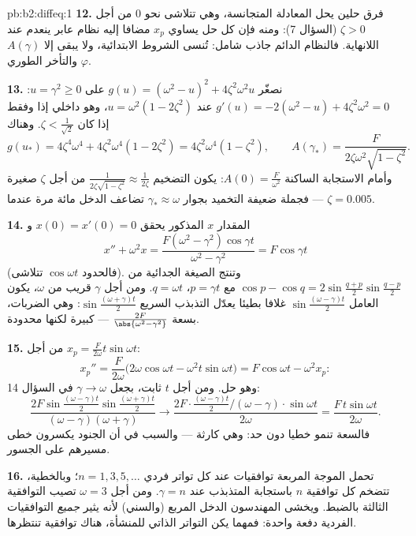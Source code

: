 \begin{solution}{pb:b2:diffeq:1}
\textbf{12.} فرق حلين يحل المعادلة المتجانسة، وهي تتلاشى نحو $0$
من أجل $\zeta > 0$ (السؤال 7): ومنه فإن كل حل يساوي $x_p$ مضافا إليه
نظام عابر ينعدم عند اللانهاية. فالنظام الدائم جاذب شامل: تُنسى
الشروط الابتدائية، ولا يبقى إلا $A(\gamma)$ والتأخر الطوري $\varphi$.

\textbf{13.} نصغّر $g(u) = (\omega^2 - u)^2 +
4\zeta^2\omega^2u$ على $u = \gamma^2 \geq 0$: $g'(u) =
-2(\omega^2 - u) + 4\zeta^2\omega^2 = 0$ عند $u = \omega^2(1 -
2\zeta^2)$، وهو داخلي
إذا وفقط إذا كان $\zeta < \frac{1}{\sqrt2}$. وهناك
\[
g(u_*) = 4\zeta^4\omega^4 + 4\zeta^2\omega^4(1 - 2\zeta^2)
= 4\zeta^2\omega^4(1 - \zeta^2),
\qquad
A(\gamma_*) = \frac{F}{2\zeta\omega^2\sqrt{1 - \zeta^2}} .
\]
وأمام الاستجابة الساكنة $A(0) = \frac{F}{\omega^2}$: يكون التضخيم $\frac{1}{2\zeta\sqrt{1-\zeta^2}} \approx
\frac{1}{2\zeta}$ من أجل $\zeta$
صغيرة --- فجملة ضعيفة التخميد بجوار $\gamma_* \approx \omega$ تضاعف الدخل مائة مرة
عندما $\zeta = 0.005$.

\textbf{14.} المقدار $x$ المذكور يحقق $x(0) = x'(0) = 0$ و
\[
x'' + \omega^2 x = \frac{F(\omega^2 -
\gamma^2)\cos\gamma t}{\omega^2 - \gamma^2} = F\cos\gamma t
\]
(فالحدود $\cos\omega t$ تتلاشى). وتنتج الصيغة الجدائية من $\cos p - \cos q = 2\sin\frac{q+p}{2}\sin\frac{q-p}2$ مع $p = \gamma t$،
$q = \omega t$. ومن أجل $\gamma$ قريب من $\omega$، يكون العامل $\sin\frac{(\omega-\gamma)t}2$ غلافا
بطيئا يعدّل التذبذب السريع $\sin\frac{(\omega+\gamma)t}2$: وهي الضربات، بسعة $\frac{2F}{\abs{\omega^2-\gamma^2}}$ --- كبيرة
لكنها محدودة.

\textbf{15.} من أجل $x_p = \frac{F}{2\omega}t\sin\omega t$:
\[
x_p'' = \frac{F}{2\omega}\bigl(2\omega\cos\omega t -
\omega^2t\sin\omega t\bigr)
= F\cos\omega t - \omega^2x_p :
\]
وهو حل. ومن أجل $t$ ثابت، بجعل $\gamma \to \omega$ في السؤال 14:
\[
\frac{2F\sin\frac{(\omega-\gamma)t}2
\sin\frac{(\omega+\gamma)t}{2}}
{(\omega-\gamma)(\omega+\gamma)}
\longrightarrow
\frac{2F\cdot\frac{(\omega-\gamma)t}2\big/(\omega-\gamma)
\cdot\sin\omega t}{2\omega}
= \frac{F\,t\sin\omega t}{2\omega} .
\]
فالسعة تنمو خطيا دون حد: وهي كارثة  --- والسبب في أن الجنود
يكسرون خطى مسيرهم على الجسور.

\textbf{16.} تحمل الموجة المربعة توافقيات عند كل تواتر فردي $n = 1, 3, 5, \dots$؛
وبالخطية، تتضخم كل توافقية $n$ باستجابة المتذبذب عند $\gamma = n$.
ومن أجل $\omega = 3$ تصيب التوافقية الثالثة  بالضبط.
ويخشى المهندسون الدخل المربع (والسني) لأنه يثير \emph{جميع}
التوافقيات الفردية دفعة واحدة: فمهما يكن التواتر الذاتي للمنشأة،
هناك توافقية تنتظرها.


\end{solution}
